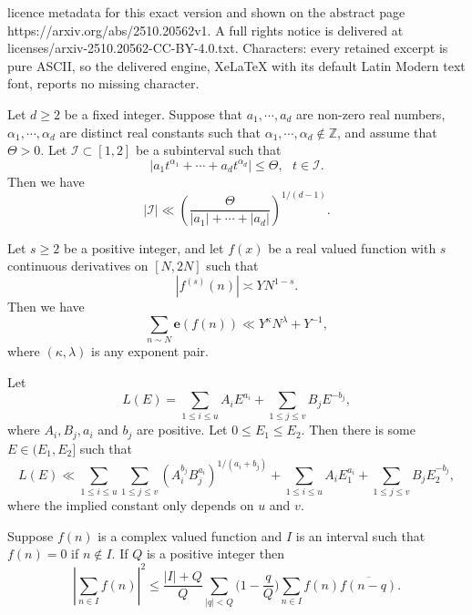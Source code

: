 \documentclass[10pt,a4paper]{amsart}
\renewcommand{\le}{\ensuremath{\leqslant}}
\begin{document}
licence metadata for this exact version and shown on the abstract page https://arxiv.org/abs/2510.20562v1. A full rights notice is delivered at licenses/arxiv-2510.20562-CC-BY-4.0.txt. Characters: every retained excerpt is pure ASCII, so the delivered engine, XeLaTeX with its default Latin Modern text font, reports no missing character.
\begin{lemma}\label{lemma: zhai's lemma}
Let $d\geqslant 2$ be a fixed integer. Suppose that $a_1,\cdots,a_d$ are non-zero real numbers,
$\alpha_1,\cdots,\alpha_d$ are distinct real constants such that $\alpha_1,\cdots,\alpha_d\not\in\mathbb{Z}$,
and assume that $\Theta>0$. Let $\mathcal{I}\subset[1,2]$ be a subinterval such that
$$
\left|a_1 t^{\alpha_1} + \cdots+a_d t^{\alpha_d} \right|\leqslant \Theta,\ \ \ t\in\mathcal{I}.
$$
Then we have
$$
|\mathcal{I}|\ll \left(\frac{\Theta}{|a_1|+\cdots+|a_d|}\right)^{1/(d-1)}.
$$
\end{lemma}

\begin{lemma}\label{lem: exponent pair method}
Let $s\geqslant 2$ be a positive integer, and let $f(x)$ be a real valued
function with $s$ continuous derivatives on $[N,2N]$ such that
$$
|f^{(s)}(n)|\asymp YN^{1-s}.
$$
Then we have
$$
\sum_{n\sim N}\mathbf{e}(f(n))\ll Y^{\kappa}N^{\lambda}+Y^{-1},
$$
where $(\kappa,\lambda)$ is any exponent pair.
\end{lemma}

\begin{lemma} \label{lemmea: balance} Let
$$
L(E)=\sum_{1\leqslant i\leqslant u}A_iE^{a_i}+\sum_{1\leqslant j\leqslant v}B_jE^{-b_j},
$$
where $A_i,B_j,a_i$ and $b_j$ are positive. Let $0\leqslant E_1\leqslant E_2$. Then there is
some $E\in(E_1,E_2]$ such that
$$
L(E)\ll \sum_{1\leqslant i\leqslant u}\sum_{1\leqslant j\leqslant v}\left(A_i^{b_j}B_j^{a_i}\right)^{1/(a_i+b_j)}
+\sum_{1\leqslant i\leqslant u}A_iE_1^{a_i}+\sum_{1\leqslant j\leqslant v}B_jE_2^{-b_j},
$$
where the implied constant only depends on $u$ and $v$.
\end{lemma}

\begin{lemma}
\label{lem:A}
Suppose $f(n)$ is a complex valued function and $I$ is an interval such that $f(n) = 0$ if $n \notin I$. If $Q$ is a positive integer then
$$
|\sum_{n \in I} f(n)|^2 \le \frac{|I| + Q}{Q} \sum_{|q|< Q} \big(1 - \frac{q}{Q} \big) \sum_{n \in I} f(n) \overline{f(n-q)}.
$$
\end{lemma}
\end{document}
